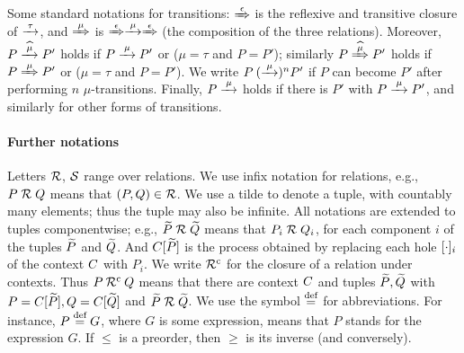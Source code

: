 Some standard notations for transitions: $\Arr\epsilon$ is the 
reflexive and transitive closure of $\arr\tau$, and 
$\Arr \mu $ is $\Arr\epsilon \arr\mu \Arr\epsilon$ (the
composition of the three relations).
Moreover,   
$ P \arcap \mu P'$ holds if $P \arr\mu P'$ or ($\mu =\tau$ and
$P=P'$); similarly 
$ P \Arcap \mu P'$ holds if $P \Arr\mu P'$ or ($\mu =\tau$ and
$P=P'$).
We write $P \:(\arr\mu)^n P'$ if $P$ can become $P'$ after performing
$n$ $\mu$-transitions. Finally, $P \arr\mu$ holds if there is $P'$
with $P \arr\mu P'$, and similarly for other forms of transitions.

\paragraph{Further notations}
Letters  $\R$, $\S$ range over relations.
We use infix notation for relations, e.g., 
$P \RR Q$ means that $(P,Q) \in \R$.
We use a tilde to denote a tuple, with countably many elements; thus
the tuple may also be infinite.
 All
notations  are  extended to tuples componentwise;
e.g., $\til P \RR \til Q$ means that $P_i \RR Q_i$, for  each  
component $i$  of the tuples $\til P$ and $\til Q$.
And $\ct{\til P}$ is the process obtained by replacing each hole
$\holei i$ of the  context $\qct$ with $P_i$.  
We write $
\ctx \R$ for the closure of a relation under contexts. Thus $P\: \ctx \R\: Q$
means that there are context $\qct$ and tuples $\til P,\til Q$ with
$P =  \ct{\til P}, Q =  \ct{\til Q}$ and $\til P \RR \til Q$.
We use the symbol $\DSdefi$ for abbreviations. For instance, $P \DSdefi G $, where
$G$ is some expression, means that $P$ stands for the expression $G$.
If $\leq$ is a preorder, then  $\geq$  is its inverse (and
conversely).
